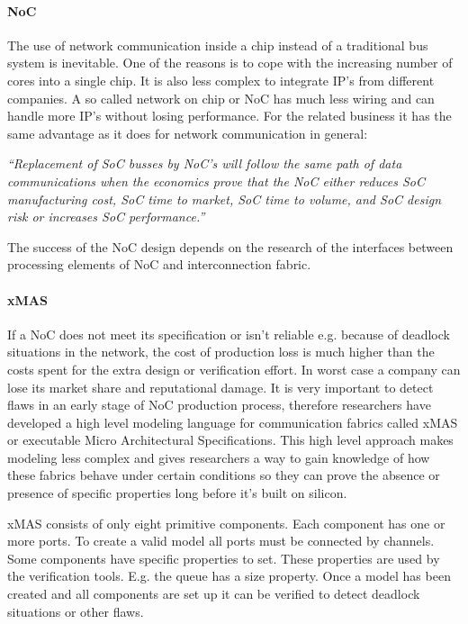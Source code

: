 \paragraph{NoC}

The use of network communication inside a chip instead of a traditional bus
system is inevitable. One of the reasons is to cope with the increasing number
of cores into a single chip. It is also less complex to integrate IP's from
different companies. A so called network on chip or NoC has much less wiring
\cite{NoC-busses} and can handle more IP's without losing performance. For the
related business it has the same advantage as it does for network communication
in general:

\textit{``Replacement of SoC busses by NoC's will follow the same path of data
communications when the economics prove that the NoC either reduces SoC
manufacturing cost, SoC time to market, SoC time to volume, and SoC design risk
or increases SoC performance.''} \cite{NoC-busses} 

The success of the NoC design depends on the research of the interfaces between
processing elements of NoC and interconnection fabric.

\paragraph{xMAS}

If a NoC does not meet its specification or isn't reliable e.g. because of
deadlock situations in the network, the cost of production loss is much higher
than the costs spent for the extra design or verification effort. In worst case
a company can lose its market share and reputational damage. It is very
important to detect flaws in an early stage of NoC production process, therefore
researchers have developed a high level modeling language for communication
fabrics called xMAS or executable Micro Architectural Specifications. This high
level approach makes modeling less complex and gives researchers a way to gain
knowledge of how these fabrics behave under certain conditions so they can prove
the absence or presence of specific properties long before it's built on
silicon.

xMAS consists of only eight primitive components. Each component has one or more
ports. To create a valid model all ports must be connected by channels. Some
components have specific properties to set. These properties are used by the
verification tools. E.g. the queue has a size property. Once a model has been
created and all components are set up it can be verified to detect deadlock
situations or other flaws.


